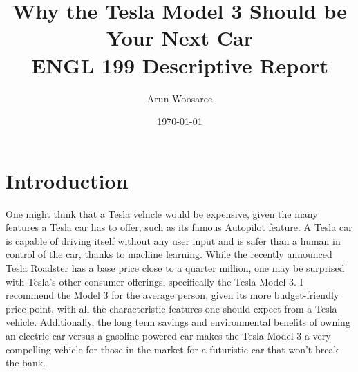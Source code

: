 \documentclass{article}
\title{Why the Tesla Model 3 Should be Your Next Car\\
\vspace{.25cm}\large ENGL 199 Descriptive Report \vspace{-.5cm}}
\author{\LARGE Arun Woosaree}
\date{\today}
\begin{document}
  \maketitle %

  \section{Introduction}

  One might think that a Tesla vehicle would be expensive, given the many
  features a Tesla car has to offer, such as its famous Autopilot feature. A Tesla car
  is capable of driving itself without any user input and is safer than a human
  in control of the car, thanks to machine learning.\cite{safer} While the recently announced
  Tesla Roadster has a base price close to a quarter million\cite{teslaroadster}, one may be
  surprised with Tesla's other consumer offerings, specifically the Tesla Model 3.
  I recommend the Model 3 for the average person, given its more budget-friendly
  price point, with all the characteristic features one should expect from a Tesla
  vehicle. Additionally, the long term savings and environmental benefits of owning
  an electric car versus a gasoline powered car makes the Tesla Model 3 a very compelling
  vehicle for those in the market for a futuristic car that won't break the bank.
\end{document}
